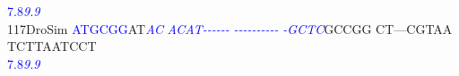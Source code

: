 \documentclass[11pt,twoside,reqno,a4paper]{article}
\begin{document}
{\hspace*{4\charwidth}\hspace*{7\charwidth}\hspace*{0\charwidth}\textcolor{Blue}{7.8}\hspace*{5\charwidth}\textit{\textcolor{Blue}{9.9}}\hspace*{1\charwidth}\hspace*{1\charwidth}\hspace*{1\charwidth}\hspace*{1\charwidth}\hspace*{1\charwidth}\hspace*{1\charwidth}\\
117\hspace*{1\charwidth}DroSim	\textcolor{Blue}{A}\textcolor{Blue}{T}\textcolor{Blue}{G}\textcolor{Blue}{C}\textcolor{Blue}{G}\textcolor{Blue}{G}AT\textit{\textcolor{Blue}{A}}\textit{\textcolor{Blue}{C}}	\textit{\textcolor{Blue}{A}}\textit{\textcolor{Blue}{C}}\textit{\textcolor{Blue}{A}}\textit{\textcolor{Blue}{T}}\textit{\textcolor{Blue}{-}}\textit{\textcolor{Blue}{-}}\textit{\textcolor{Blue}{-}}\textit{\textcolor{Blue}{-}}\textit{\textcolor{Blue}{-}}\textit{\textcolor{Blue}{-}}	\textit{\textcolor{Blue}{-}}\textit{\textcolor{Blue}{-}}\textit{\textcolor{Blue}{-}}\textit{\textcolor{Blue}{-}}\textit{\textcolor{Blue}{-}}\textit{\textcolor{Blue}{-}}\textit{\textcolor{Blue}{-}}\textit{\textcolor{Blue}{-}}\textit{\textcolor{Blue}{-}}\textit{\textcolor{Blue}{-}}	\textit{\textcolor{Blue}{-}}\textit{\textcolor{Blue}{G}}\textit{\textcolor{Blue}{C}}\textit{\textcolor{Blue}{T}}\textit{\textcolor{Blue}{C}}GCCGG	CT---CGTAA	TCTTAATCCT	\\
\hspace*{4\charwidth}\hspace*{7\charwidth}\hspace*{0\charwidth}\textcolor{Blue}{7.8}\hspace*{5\charwidth}\textit{\textcolor{Blue}{9.9}}\hspace*{1\charwidth}\hspace*{1\charwidth}\hspace*{1\charwidth}\hspace*{1\charwidth}\hspace*{1\charwidth}\hspace*{1\charwidth}\\
}
\end{document}
